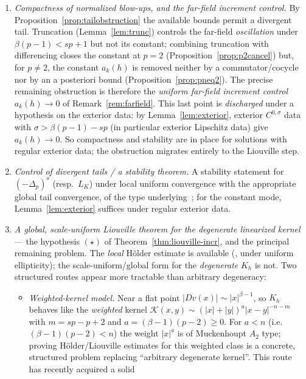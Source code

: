 \documentclass[11pt]{amsart}
\theoremstyle{plain}
\theoremstyle{definition}
\theoremstyle{remark}
\newcommand{\fpl}[1]{(-\Delta_p)^{s}#1}
\begin{document}
\begin{enumerate}[leftmargin=2em]
\item \emph{Compactness of normalized blow-ups, and the far-field increment
control.} By Proposition~\ref{prop:tailobstruction} the available bounds permit
a divergent tail. Truncation (Lemma~\ref{lem:trunc}) controls the far-field
\emph{oscillation} under $\beta(p-1)<sp+1$ but not its constant; combining
truncation with differencing closes the constant at $p=2$
(Proposition~\ref{prop:p2cancel}) but, for $p\neq2$, the constant $a_k(h)$ is
removed neither by a commutator/cocycle nor by an a posteriori bound
(Proposition~\ref{prop:pneq2}). The precise remaining obstruction is therefore
the \emph{uniform far-field increment control} $a_k(h)\to0$ of
Remark~\ref{rem:farfield}. This last point is \emph{discharged} under a
hypothesis on the exterior data: by Lemma~\ref{lem:exterior}, exterior
$C^{0,\sigma}$ data with $\sigma>\beta(p-1)-sp$ (in particular exterior
Lipschitz data) give $a_k(h)\to0$. So compactness and stability are in place for
solutions with regular exterior data; the obstruction migrates entirely to the
Liouville step.
\item \emph{Control of divergent tails / a stability theorem.} A stability
statement for $\fpl{}$ (resp.\ $L_{K}$) under local uniform convergence with
the appropriate global tail convergence, of the type underlying~\cite{BLS,KKL};
for the constant mode, Lemma~\ref{lem:exterior} suffices under regular exterior
data.
\item \emph{A global, scale-uniform Liouville theorem for the degenerate
linearized kernel} --- the hypothesis $(\star)$ of
Theorem~\ref{thm:liouville-incr}, and the principal remaining problem. The
\emph{local} H\"older estimate is available (\cite[\S7]{GJS,FRO,Serra}, under
uniform ellipticity); the scale-uniform/global form for the \emph{degenerate}
$K_h$ is not. Two structured routes appear more tractable than arbitrary
degeneracy:
\begin{itemize}[leftmargin=2.2em]
\item[(W)] \emph{Weighted-kernel model.} Near a flat point $|Dv(x)|\sim
  |x|^{\beta-1}$, so $K_h$ behaves like the \emph{weighted} kernel
  $\mathcal K(x,y)\sim(|x|+|y|)^{a}|x-y|^{-n-m}$ with $m=sp-p+2$ and
  $a=(\beta-1)(p-2)\ge0$. For $a<n$ (i.e.\ $(\beta-1)(p-2)<n$) the weight
  $|x|^a$ is of Muckenhoupt $A_2$ type; proving H\"older/Liouville estimates
  for this weighted class is a concrete, structured problem replacing
  ``arbitrary degenerate kernel''. This route has recently acquired a solid

\end{itemize}
\end{enumerate}
\end{document}
